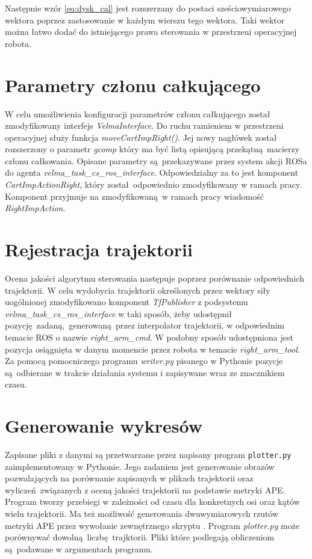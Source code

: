 Następnie wzór \ref{eq:dysk_cal} jest rozszerzany do postaci sześciowymiarowego wektora poprzez zastosowanie w każdym wierszu tego wektora. Taki wektor można łatwo dodać do istniejącego prawa sterowania w przestrzeni operacyjnej robota.

\section{Parametry członu całkującego}
W celu umożliwienia konfiguracji parametrów członu całkującego został zmodyfikowany interfejs \textit{VelmaInterface}. Do ruchu ramieniem w przestrzeni operacyjnej służy funkcja \textit{moveCartImpRight()}. Jej nowy nagłówek został rozszerzony o parametr \textit{gcomp} który ma być listą opisującą przekątną macierzy członu całkowania. Opisane parametry są przekazywane przez system akcji ROSa do agenta \textit{velma\_task\_cs\_ros\_interface}. Odpowiedzialny za to jest komponent \textit{CartImpActionRight}, który został odpowiednio zmodyfikowany w ramach pracy. Komponent przyjmuje na zmodyfikowaną w ramach pracy wiadomość \textit{RightImpAction}. 
 
\section{Rejestracja trajektorii}
Ocena jakości algorytmu sterowania następuje poprzez porównanie odpowiednich trajektorii. W celu wydobycia trajektorii określonych przez wektory siły uogólnionej zmodyfikowano komponent \textit{TfPublisher} z podsystemu \textit{velma\_task\_cs\_ros\_interface} w taki sposób, żeby udostępnił pozycję zadaną, generowaną przez interpolator trajektorii, w odpowiednim temacie ROS o nazwie \textit{right\_arm\_cmd}. W podobny sposób udostępniona jest pozycja osiągnięta w danym momencie przez robota w temacie \textit{right\_arm\_tool}. Za pomocą pomocniczego programu \textit{writer.py} pisanego w Pythonie pozycje są odbierane w trakcie działania systemu i zapisywane wraz ze znacznikiem czasu.


\section{Generowanie wykresów}
Zapisane pliki z danymi są przetwarzane przez napisany program \texttt{plotter.py} zaimplementowany w Pythonie. Jego zadaniem jest generowanie obrazów pozwalających na porównanie zapisanych w plikach trajektorii oraz wyliczeń związanych z oceną jakości trajektorii na podstawie metryki APE. Program tworzy przebiegi w zależności od czasu dla konkretnych osi oraz kątów wielu trajektorii. Ma też możliwość generowania dwuwymiarowych rzutów metryki APE przez wywołanie zewnętrznego skryptu \cite{bib:evaluate_ape}. Program \textit{plotter.py} może porównywać dowolną liczbę trajktorii. Pliki które podlegają obliczeniom są podawane w argumentach programu.



